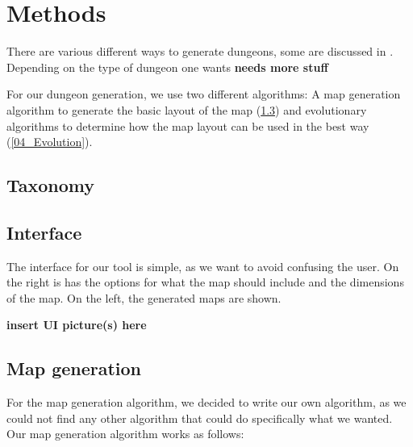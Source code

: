 \section{Methods}
\label{04}

There are various different ways to generate dungeons, some are discussed in \cite[Chapter 3]{PCGBook}. Depending on the type of dungeon one wants \textbf{needs more stuff}

For our dungeon generation, we use two different algorithms: A map generation algorithm to generate the basic layout of the map (\ref{04_MapGeneration}) and evolutionary algorithms\cite[Chapter 2]{IoEC} to determine how the map layout can be used in the best way (\ref{04_Evolution}).

\subsection{Taxonomy}
\label{04_Taxonomy}

\subsection{Interface}
\label{04_Interface}

The interface for our tool is simple, as we want to avoid confusing the user. On the right is has the options for what the map should include and the dimensions of the map. On the left, the generated maps are shown.

\textbf{insert UI picture(s) here}




\subsection{Map generation}
\label{04_MapGeneration}

For the map generation algorithm, we decided to write our own algorithm, as we could not find any other algorithm that could do specifically what we wanted. Our map generation algorithm works as follows:

